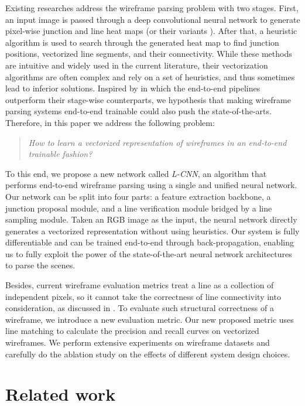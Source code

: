 \documentclass[10pt,twocolumn,letterpaper]{article}
\begin{document}
Existing researches \cite{Huang:2018:LPW, xue2018learning} address the wireframe parsing problem with two stages. First, an input image is passed through a deep convolutional neural network to generate pixel-wise junction and line heat maps (or their variants \cite{xue2018learning}). After that, a heuristic algorithm is used to search through the generated heat map to find junction positions, vectorized line segments, and their connectivity. While these methods are intuitive and widely used in the current literature, their vectorization algorithms are often complex and rely on a set of heuristics, and thus sometimes lead to inferior solutions. Inspired by \cite{dai2016instance, he2017mask, girshick2015fast} in which the end-to-end pipelines outperform their stage-wise counterparts, we hypothesis that making wireframe parsing systems end-to-end trainable could also push the state-of-the-arts. Therefore, in this paper we address the following problem:
\begin{quote}
    {\em How to learn a vectorized representation of wireframes in an end-to-end trainable fashion?}
\end{quote}

To this end, we propose a new network called {\em L-CNN}, an algorithm that performs end-to-end wireframe parsing using a single and unified neural network. Our network can be split into four parts: a feature extraction backbone, a junction proposal module, and a line verification module bridged by a line sampling module. Taken an RGB image as the input, the neural network directly generates a vectorized representation without using heuristics. Our system is fully differentiable and can be trained end-to-end through back-propagation, enabling us to fully exploit the power of the state-of-the-art neural network architectures to parse the scenes.

Besides, current wireframe evaluation metrics treat a line as a collection of independent pixels, so it cannot take the correctness of line connectivity into consideration, as discussed in . To evaluate such structural correctness of a wireframe, we introduce a new evaluation metric. Our new proposed metric uses line matching to calculate the precision and recall curves on vectorized wireframes.  We perform extensive experiments on wireframe datasets \cite{Huang:2018:LPW} and carefully do the ablation study on the effects of different system design choices.

\section{Related work} \label{sec:related}
\end{document}
